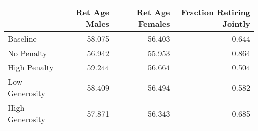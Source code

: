 \begin{tabular}{lrrr}
\toprule
{} & Ret Age Males & Ret Age Females & Fraction Retiring Jointly \\
\midrule
Baseline        &        58.075 &          56.403 &                     0.644 \\
No Penalty      &        56.942 &          55.953 &                     0.864 \\
High Penalty    &        59.244 &          56.664 &                     0.504 \\
Low Generosity  &        58.409 &          56.494 &                     0.582 \\
High Generosity &        57.871 &          56.343 &                     0.685 \\
\bottomrule
\end{tabular}
